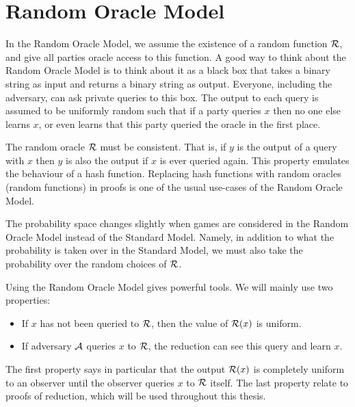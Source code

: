 \section{Random Oracle Model}

In the Random Oracle Model, we assume the existence of a random function $\operatorname{\mathcal{R}}$, and give all parties oracle access to this function. A good way to think about the Random Oracle Model is to think about it as a black box that takes a binary string as input and returns a binary string as output. Everyone, including the adversary, can ask private queries to this box. The output to each query is assumed to be uniformly random such that if a party queries $x$ then no one else learns $x$, or even learns that this party queried the oracle in the first place. 

The random oracle $\operatorname{\mathcal{R}}$ must be consistent. That is, if $y$ is the output of a query with $x$ then $y$ is also the output if $x$ is ever queried again. This property emulates the behaviour of a hash function. Replacing hash functions with random oracles (random functions) in proofs is one of the usual use-cases of the Random Oracle Model.  

The probability space changes slightly when games are considered in the Random Oracle Model instead of the Standard Model. Namely, in addition to what the probability is taken over in the Standard Model, we must also take the probability over the random choices of $\operatorname{\mathcal{R}}$. 

Using the Random Oracle Model gives powerful tools. We will mainly use two properties: 

\begin{itemize}
	\itemsep-0.1em
	\item If $x$ has not been queried to $\operatorname{\mathcal{R}}$, then the value of $\operatorname{\mathcal{R}}(x)$ is uniform. 
	\item If adversary $\mathcal{A}$ queries $x$ to $\operatorname{\mathcal{R}}$, the reduction can see this query and learn $x$. 
\end{itemize}

The first property says in particular that the output $\operatorname{\mathcal{R}}(x)$ is completely uniform to an observer until the observer queries $x$ to $\operatorname{\mathcal{R}}$ itself. The last property relate to proofs of reduction, which will be used throughout this thesis. 

